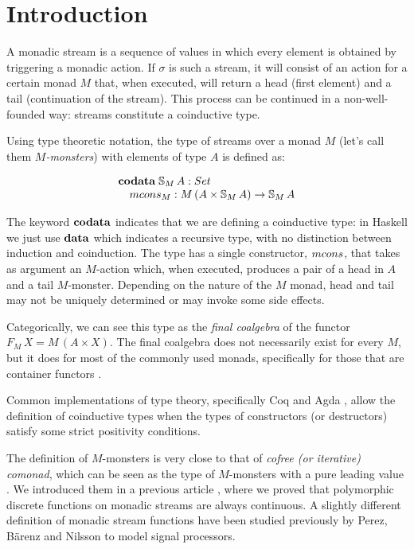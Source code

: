 \section{Introduction}

A monadic stream is a sequence of values in which every element is obtained by triggering a monadic action.
If $\sigma$ is such a stream, it will consist of an action for a certain monad $M$ that, when executed, will return a head (first element) and a tail (continuation of the stream).
This process can be continued in a non-well-founded way: streams constitute a coinductive type.

Using type theoretic notation, the type of streams over a monad $M$ (let's call them {\em $M$-monsters}) with elements of type $A$ is defined as:

$$
\begin{array}[t]{l}
\codata\;
\stream{M}\,A:\set\\
\quad \mcons_M: M\,(A\times \stream{M}\,A)\rightarrow\stream{M}\,A
\end{array}
$$

The keyword $\mathbf{codata}$ indicates that we are defining a coinductive type: in Haskell we just use $\mathbf{data}$ which indicates a recursive type, with no distinction between induction and coinduction. 
The type has a single constructor, $\mcons$, that takes as argument an $M$-action which, when executed, produces a pair of a head in $A$ and a tail $M$-monster.
Depending on the nature of the $M$ monad, head and tail may not be uniquely determined or may invoke some side effects.

Categorically, we can see this type as the {\em final coalgebra} of the functor $F_M\,X = M\,(A\times X)$.
The final coalgebra does not necessarily exist for every $M$, 
but it does for most of the commonly used monads, specifically for those that are container functors \cite{AAG:2005}.

Common implementations of type theory, specifically Coq \cite{coq} and Agda \cite{agda}, allow the definition of coinductive types when the types of constructors (or destructors) satisfy some strict positivity conditions.

The definition of $M$-monsters is very close to that of {\em cofree (or iterative) comonad}, which can be seen as the type of $M$-monsters with a pure 
leading value \cite{AAMV:2003,CUV:2006}.
We introduced them in a previous article \cite{capretta/fowler:2017}, where we proved that polymorphic discrete functions on monadic streams are always continuous.
A slightly different definition of monadic stream functions have been studied previously by Perez, B{\"{a}}renz and Nilsson \cite{PBN:2016} to model signal processors.

